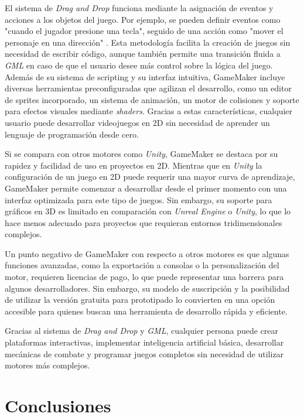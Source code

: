 El sistema de \textit{Drag and Drop} funciona mediante la asignación de eventos y acciones a los objetos del juego. Por ejemplo, se pueden definir eventos como "cuando el jugador presione una tecla", seguido de una acción como "mover el personaje en una dirección" . Esta metodología facilita la creación de juegos sin necesidad de escribir código, aunque también permite una transición fluida a \textit{GML} en caso de que el usuario desee más control sobre la lógica del juego.\\


Además de su sistema de scripting y su interfaz intuitiva, GameMaker incluye diversas herramientas preconfiguradas que agilizan el desarrollo, como un editor de sprites incorporado, un sistema de animación, un motor de colisiones y soporte para efectos visuales mediante \textit{shaders}. Gracias a estas características, cualquier usuario puede desarrollar videojuegos en 2D sin necesidad de aprender un lenguaje de programación desde cero.\

Si se compara con otros motores como \textit{Unity}, GameMaker se destaca por su rapidez y facilidad de uso en proyectos en 2D. Mientras que en \textit{Unity} la configuración de un juego en 2D puede requerir una mayor curva de aprendizaje, GameMaker permite comenzar a desarrollar desde el primer momento con una interfaz optimizada para este tipo de juegos. Sin embargo, su soporte para gráficos en 3D es limitado en comparación con \textit{Unreal Engine} o \textit{Unity}, lo que lo hace menos adecuado para proyectos que requieran entornos tridimensionales complejos.\

Un punto negativo de GameMaker con respecto a otros motores es que algunas funciones avanzadas, como la exportación a consolas o la personalización del motor, requieren licencias de pago, lo que puede representar una barrera para algunos desarrolladores. Sin embargo, su modelo de suscripción y la posibilidad de utilizar la versión gratuita para prototipado lo convierten en una opción accesible para quienes buscan una herramienta de desarrollo rápida y eficiente.

Gracias al sistema de \textit{Drag and Drop} y \textit{GML}, cualquier persona puede crear plataformas interactivas, implementar inteligencia artificial básica, desarrollar mecánicas de combate y programar juegos completos sin necesidad de utilizar motores más complejos.
\section{Conclusiones}

